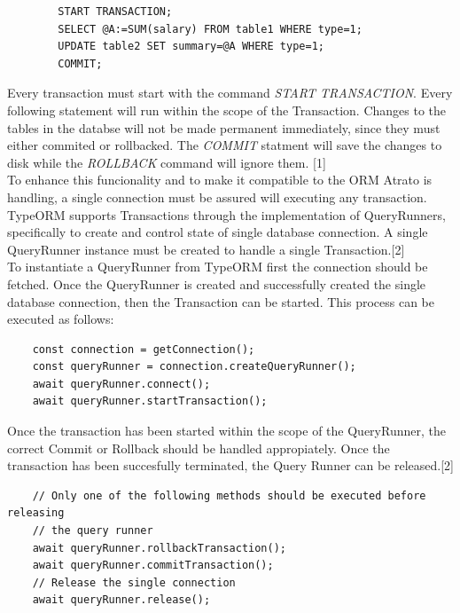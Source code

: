 \begin{center}
    \begin{verbatim}
        START TRANSACTION;
        SELECT @A:=SUM(salary) FROM table1 WHERE type=1;
        UPDATE table2 SET summary=@A WHERE type=1;
        COMMIT;
    \end{verbatim}
\end{center}

Every transaction must start with the command \textit{START TRANSACTION}. Every following statement will run within the scope of the Transaction. Changes to the tables in the databse will not be made permanent immediately, since they must either commited or rollbacked. The \textit{COMMIT} statment will save the changes to disk while the \textit{ROLLBACK} command will ignore them. [1]\\

To enhance this funcionality and to make it compatible to the ORM Atrato is handling, a single connection must be assured will executing any transaction. TypeORM supports Transactions through the implementation of QueryRunners, specifically to create and control state of single database connection. A single QueryRunner instance must be created to handle a single Transaction.[2]\\ 

To instantiate a QueryRunner from TypeORM first the connection should be fetched. Once the QueryRunner is created and successfully created the single database connection, then the Transaction can be started. This process can be executed as follows:

\begin{verbatim}
    const connection = getConnection();
    const queryRunner = connection.createQueryRunner();
    await queryRunner.connect();
    await queryRunner.startTransaction();
\end{verbatim}

Once the transaction has been started within the scope of the QueryRunner, the correct Commit or Rollback should be handled appropiately. Once the transaction has been succesfully terminated, the Query Runner can be released.[2]

\begin{verbatim}
    // Only one of the following methods should be executed before releasing
    // the query runner
    await queryRunner.rollbackTransaction();
    await queryRunner.commitTransaction();
    // Release the single connection
    await queryRunner.release();
\end{verbatim}


